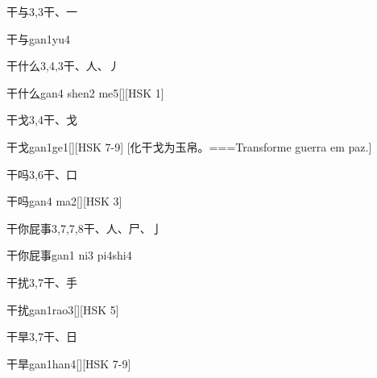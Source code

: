 \begin{Entry}{干与}{3,3}{⼲、⼀}
  \begin{Phonetics}{干与}{gan1yu4}
  \end{Phonetics}
\end{Entry}

\begin{Entry}{干什么}{3,4,3}{⼲、⼈、⼃}
  \begin{Phonetics}{干什么}{gan4 shen2 me5}[][HSK 1]
  \end{Phonetics}
\end{Entry}

\begin{Entry}{干戈}{3,4}{⼲、⼽}
  \begin{Phonetics}{干戈}{gan1ge1}[][HSK 7-9]
    [化干戈为玉帛。===Transforme guerra em paz.]
  \end{Phonetics}
\end{Entry}

\begin{Entry}{干吗}{3,6}{⼲、⼝}
  \begin{Phonetics}{干吗}{gan4 ma2}[][HSK 3]
  \end{Phonetics}
\end{Entry}

\begin{Entry}{干你屁事}{3,7,7,8}{⼲、⼈、⼫、⼅}
  \begin{Phonetics}{干你屁事}{gan1 ni3 pi4shi4}
  \end{Phonetics}
\end{Entry}

\begin{Entry}{干扰}{3,7}{⼲、⼿}
  \begin{Phonetics}{干扰}{gan1rao3}[][HSK 5]
  \end{Phonetics}
\end{Entry}

\begin{Entry}{干旱}{3,7}{⼲、⽇}
  \begin{Phonetics}{干旱}{gan1han4}[][HSK 7-9]
  \end{Phonetics}
\end{Entry}

